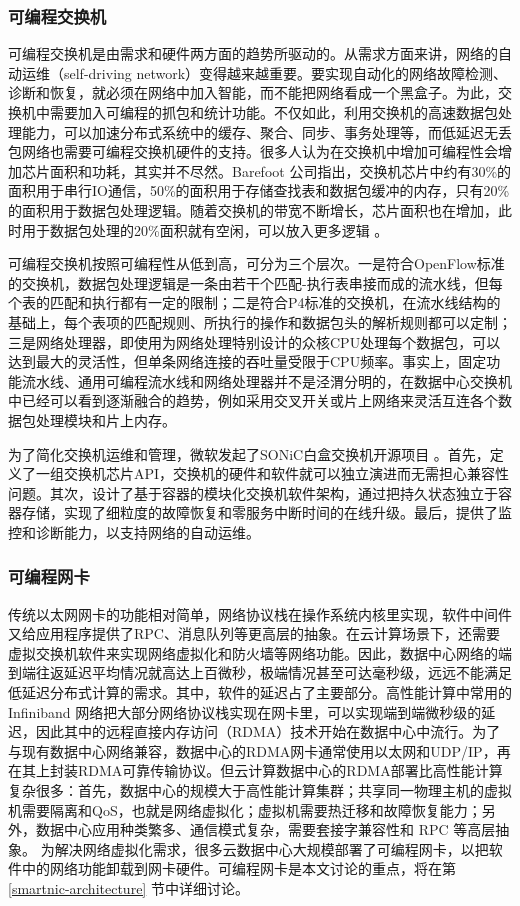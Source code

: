 \subsubsection{可编程交换机}

可编程交换机是由需求和硬件两方面的趋势所驱动的。从需求方面来讲，网络的自动运维（self-driving network）变得越来越重要。要实现自动化的网络故障检测、诊断和恢复，就必须在网络中加入智能，而不能把网络看成一个黑盒子。为此，交换机中需要加入可编程的抓包和统计功能。不仅如此，利用交换机的高速数据包处理能力，可以加速分布式系统中的缓存、聚合、同步、事务处理等，而低延迟无丢包网络也需要可编程交换机硬件的支持。很多人认为在交换机中增加可编程性会增加芯片面积和功耗，其实并不尽然。Barefoot 公司指出，交换机芯片中约有30\%的面积用于串行IO通信，50\%的面积用于存储查找表和数据包缓冲的内存，只有20\%的面积用于数据包处理逻辑。随着交换机的带宽不断增长，芯片面积也在增加，此时用于数据包处理的20\%面积就有空闲，可以放入更多逻辑 \cite{barefoot-programmable}。

可编程交换机按照可编程性从低到高，可分为三个层次。一是符合OpenFlow标准的交换机，数据包处理逻辑是一条由若干个匹配-执行表串接而成的流水线，但每个表的匹配和执行都有一定的限制；二是符合P4标准的交换机，在流水线结构的基础上，每个表项的匹配规则、所执行的操作和数据包头的解析规则都可以定制；三是网络处理器，即使用为网络处理特别设计的众核CPU处理每个数据包，可以达到最大的灵活性，但单条网络连接的吞吐量受限于CPU频率。事实上，固定功能流水线、通用可编程流水线和网络处理器并不是泾渭分明的，在数据中心交换机中已经可以看到逐渐融合的趋势，例如采用交叉开关或片上网络来灵活互连各个数据包处理模块和片上内存。

为了简化交换机运维和管理，微软发起了SONiC白盒交换机开源项目 \cite{sonic}。首先，定义了一组交换机芯片API，交换机的硬件和软件就可以独立演进而无需担心兼容性问题。其次，设计了基于容器的模块化交换机软件架构，通过把持久状态独立于容器存储，实现了细粒度的故障恢复和零服务中断时间的在线升级。最后，提供了监控和诊断能力，以支持网络的自动运维。

\subsubsection{可编程网卡}

传统以太网网卡的功能相对简单，网络协议栈在操作系统内核里实现，软件中间件又给应用程序提供了RPC、消息队列等更高层的抽象。在云计算场景下，还需要虚拟交换机软件来实现网络虚拟化和防火墙等网络功能。因此，数据中心网络的端到端往返延迟平均情况就高达上百微秒，极端情况甚至可达毫秒级，远远不能满足低延迟分布式计算的需求。其中，软件的延迟占了主要部分。高性能计算中常用的Infiniband \cite{infiniband2000infiniband} 网络把大部分网络协议栈实现在网卡里，可以实现端到端微秒级的延迟，因此其中的远程直接内存访问（RDMA）技术开始在数据中心中流行。为了与现有数据中心网络兼容，数据中心的RDMA网卡通常使用以太网和UDP/IP，再在其上封装RDMA可靠传输协议。但云计算数据中心的RDMA部署比高性能计算复杂很多：首先，数据中心的规模大于高性能计算集群；共享同一物理主机的虚拟机需要隔离和QoS，也就是网络虚拟化；虚拟机需要热迁移和故障恢复能力；另外，数据中心应用种类繁多、通信模式复杂，需要套接字兼容性和 RPC 等高层抽象。
为解决网络虚拟化需求，很多云数据中心大规模部署了可编程网卡，以把软件中的网络功能卸载到网卡硬件。可编程网卡是本文讨论的重点，将在第 \ref{smartnic-architecture} 节中详细讨论。

